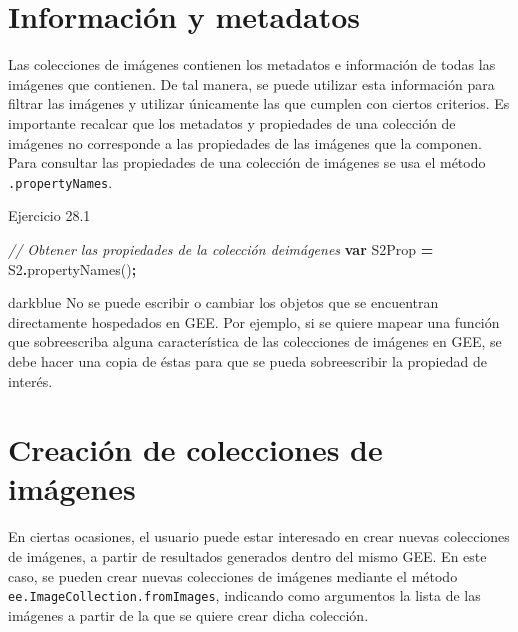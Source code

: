 \documentclass[
  12pt,
  letterpaper,
  twoside]{book}
\newenvironment{Shaded}{\begin{snugshade}}{\end{snugshade}}
\newcommand{\CommentTok}[1]{\textcolor[rgb]{0.56,0.35,0.01}{\textit{#1}}}
\newcommand{\FunctionTok}[1]{\textcolor[rgb]{0.00,0.00,0.00}{#1}}
\newcommand{\KeywordTok}[1]{\textcolor[rgb]{0.13,0.29,0.53}{\textbf{#1}}}
\newcommand{\NormalTok}[1]{#1}
\newcommand{\OperatorTok}[1]{\textcolor[rgb]{0.81,0.36,0.00}{\textbf{#1}}}
\begin{document}
\hypertarget{informaciuxf3n-y-metadatos-4}{%
\section{Información y metadatos}\label{informaciuxf3n-y-metadatos-4}}

Las colecciones de imágenes contienen los metadatos e información de todas las imágenes que contienen. De tal manera, se puede utilizar esta información para filtrar las imágenes y utilizar únicamente las que cumplen con ciertos criterios. Es importante recalcar que los metadatos y propiedades de una colección de imágenes no corresponde a las propiedades de las imágenes que la componen. Para consultar las propiedades de una colección de imágenes se usa el método \texttt{.propertyNames}.

Ejercicio 28.1

\begin{Shaded}
\begin{Highlighting}[]
\CommentTok{// Obtener las propiedades de la colección deimágenes}
\KeywordTok{var}\NormalTok{ S2Prop }\OperatorTok{=}\NormalTok{ S2}\OperatorTok{.}\FunctionTok{propertyNames}\NormalTok{()}\OperatorTok{;}
\end{Highlighting}
\end{Shaded}

\begin{bluebox2}

\begin{awesomeblock}{5pt}{\faLightbulb}{darkblue}
No se puede escribir o cambiar los objetos que se encuentran directamente hospedados en GEE. Por ejemplo, si se quiere mapear una función que sobreescriba alguna característica de las colecciones de imágenes en GEE, se debe hacer una copia de éstas para que se pueda sobreescribir la propiedad de interés.

\end{awesomeblock}

\end{bluebox2}

\hypertarget{creaciuxf3n-de-colecciones-de-imuxe1genes}{%
\section{Creación de colecciones de imágenes}\label{creaciuxf3n-de-colecciones-de-imuxe1genes}}

En ciertas ocasiones, el usuario puede estar interesado en crear nuevas colecciones de imágenes, a partir de resultados generados dentro del mismo GEE. En este caso, se pueden crear nuevas colecciones de imágenes mediante el método \texttt{ee.ImageCollection.fromImages}, indicando como argumentos la lista de las imágenes a partir de la que se quiere crear dicha colección.
\end{document}

